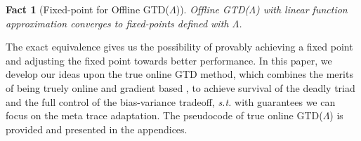 \documentclass{article}
\newcommand\st{\textit{s.t.}}
\newtheorem{fact}{Fact}[section]
\begin{document}
\par
\begin{fact}[Fixed-point for Offline GTD($\Lambda$)]
Offline GTD($\Lambda$) with linear function approximation converges to fixed-points defined with $\Lambda$.
\end{fact}
The exact equivalence gives us the possibility of provably achieving a fixed point and adjusting the fixed point towards better performance. In this paper, we develop our ideas upon the true online GTD method, which combines the merits of being truely online and gradient based \cite{hasselt2014true}, to achieve survival of the deadly triad and the full control of the bias-variance tradeoff, \st{} with guarantees we can focus on the meta trace adaptation. The pseudocode of true online GTD($\Lambda$) is provided and presented in the appendices.
\end{document}
